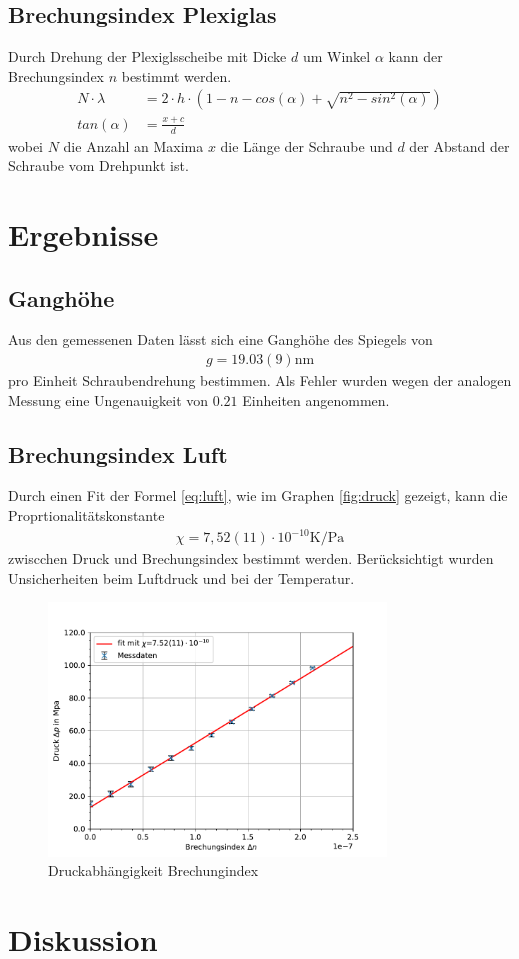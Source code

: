 \documentclass[11pt, a4paper]{article}
\begin{document}
    \subsection{Brechungsindex Plexiglas}
    Durch Drehung der Plexiglsscheibe mit Dicke $d$ um Winkel $\alpha$ kann der Brechungsindex $n$ bestimmt werden.
    \begin{align}
        N \cdot \lambda &= 2 \cdot h \cdot \left(1 - n - cos(\alpha) + \sqrt{n^2 - sin^2(\alpha)}\right) \\
        tan(\alpha) &= \frac{x + c}{d}
    \end{align}
    wobei $N$ die Anzahl an Maxima $x$ die Länge der Schraube und $d$ der Abstand der Schraube vom Drehpunkt ist.

    \section{Ergebnisse}
    \subsection{Ganghöhe}

    Aus den gemessenen Daten lässt sich eine Ganghöhe des Spiegels von
    \begin{align}
        g = 19.03(9) \si{\nano\metre}
    \end{align}
    pro Einheit Schraubendrehung bestimmen. Als Fehler wurden wegen der analogen Messung eine Ungenauigkeit von $0.21$ Einheiten angenommen.  
    
    \subsection{Brechungsindex Luft}

    Durch einen Fit der Formel \ref{eq:luft}, wie im Graphen \ref{fig:druck} gezeigt, kann die Proprtionalitätskonstante
    \begin{align}
        \chi = 7,52(11) \cdot 10^{-10} \si{\kelvin\per\pascal}
    \end{align}
    zwiscchen Druck und Brechungsindex bestimmt werden. Berücksichtigt wurden Unsicherheiten beim Luftdruck und bei der Temperatur.

    \begin{figure}
        \centering
        \includegraphics[width=0.8\textwidth]{./plots/druck.pdf}
        \caption{Druckabhängigkeit Brechungindex}
        \label{fig:luft}
    \end{figure}

    \section{Diskussion}

    
    
\end{document}
